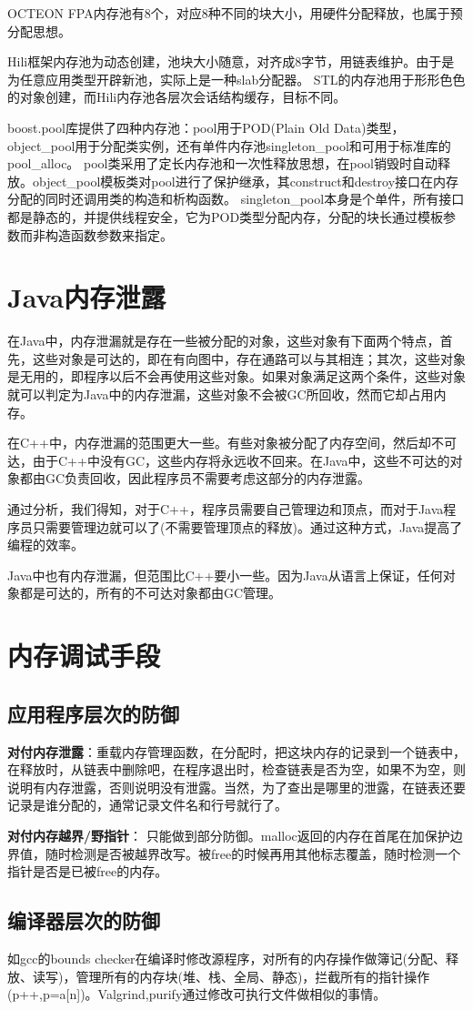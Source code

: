 OCTEON FPA内存池有8个，对应8种不同的块大小，用硬件分配释放，也属于预分配思想。

Hili框架内存池为动态创建，池块大小随意，对齐成8字节，用链表维护。由于是为任意应用类型开辟新池，实际上是一种slab分配器。
STL的内存池用于形形色色的对象创建，而Hili内存池各层次会话结构缓存，目标不同。

boost.pool库提供了四种内存池：pool用于POD(Plain Old Data)类型，object\_pool用于分配类实例，还有单件内存池singleton\_pool和可用于标准库的pool\_alloc。
pool类采用了定长内存池和一次性释放思想，在pool销毁时自动释放。object\_pool模板类对pool进行了保护继承，其construct和destroy接口在内存分配的同时还调用类的构造和析构函数。
singleton\_pool本身是个单件，所有接口都是静态的，并提供线程安全，它为POD类型分配内存，分配的块长通过模板参数而非构造函数参数来指定。


\section{Java内存泄露}
在Java中，内存泄漏就是存在一些被分配的对象，这些对象有下面两个特点，首先，这些对象是可达的，即在有向图中，存在通路可以与其相连；其次，这些对象是无用的，即程序以后不会再使用这些对象。如果对象满足这两个条件，这些对象就可以判定为Java中的内存泄漏，这些对象不会被GC所回收，然而它却占用内存。

在C++中，内存泄漏的范围更大一些。有些对象被分配了内存空间，然后却不可达，由于C++中没有GC，这些内存将永远收不回来。在Java中，这些不可达的对象都由GC负责回收，因此程序员不需要考虑这部分的内存泄露。

通过分析，我们得知，对于C++，程序员需要自己管理边和顶点，而对于Java程序员只需要管理边就可以了(不需要管理顶点的释放)。通过这种方式，Java提高了编程的效率。

Java中也有内存泄漏，但范围比C++要小一些。因为Java从语言上保证，任何对象都是可达的，所有的不可达对象都由GC管理。



\section{内存调试手段}

\subsection{应用程序层次的防御}
\textbf{对付内存泄露}：重载内存管理函数，在分配时，把这块内存的记录到一个链表中，在释放时，从链表中删除吧，在程序退出时，检查链表是否为空，如果不为空，则说明有内存泄露，否则说明没有泄露。当然，为了查出是哪里的泄露，在链表还要记录是谁分配的，通常记录文件名和行号就行了。

\textbf{对付内存越界/野指针}：
只能做到部分防御。malloc返回的内存在首尾在加保护边界值，随时检测是否被越界改写。被free的时候再用其他标志覆盖，随时检测一个指针是否是已被free的内存。

\subsection{编译器层次的防御}
如gcc的bounds checker在编译时修改源程序，对所有的内存操作做簿记(分配、释放、读写)，管理所有的内存块(堆、栈、全局、静态)，拦截所有的指针操作(p++,p=a[n])。Valgrind,purify通过修改可执行文件做相似的事情。











